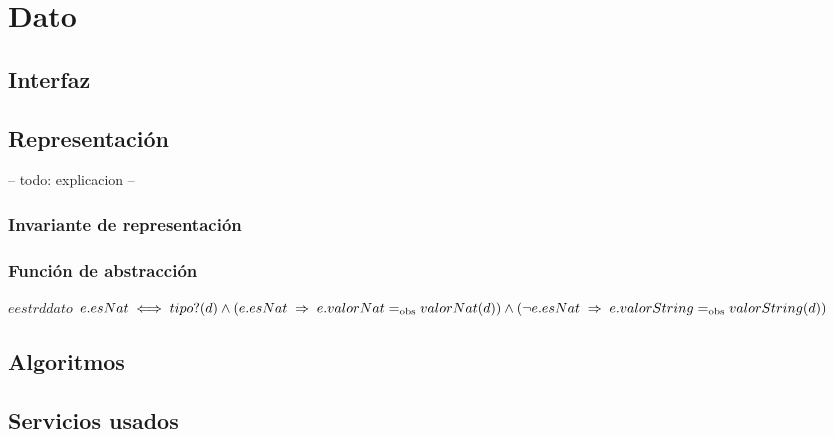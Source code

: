 \section{Dato}

\subsection{Interfaz}

\iusa{}

\ioperaciones

\subsection{Representación}

-- todo: explicacion --


\subsubsection{Invariante de representación}


\subsubsection{Función de abstracción}

\begin{ABS}{$e$}{$estr$}{$d$}{$dato$}
    $
    e.esNat \iff tipo?(d) \land \\
    (e.esNat \implies e.valorNat \igobs valorNat(d)) \land \\
    (\neg e.esNat \implies e.valorString \igobs valorString(d))
    $
\end{ABS}

\subsection{Algoritmos}

\subsection{Servicios usados}

